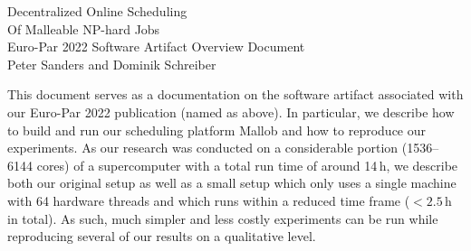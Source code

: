 \documentclass[runningheads]{article}
\numberwithin{dummy}{subsection}
\begin{document}
\begin{center}
\huge Decentralized Online Scheduling\\Of Malleable NP-hard Jobs\\[0.4cm]
\Large Euro-Par 2022 Software Artifact Overview Document\\[0.4cm]
\large Peter Sanders and Dominik Schreiber
\end{center}


%
%
%
%
%
%
%
%

\newenvironment{ttfenv}{\par\vspace{0.2cm}\ttfamily}{\par\vspace{0.2cm}}
\newenvironment{ttfenvcompact}{\par\ttfamily}{\par}

\vspace{0.3cm}

This document serves as a documentation on the software artifact associated with our Euro-Par 2022 publication (named as above).
In particular, we describe how to build and run our scheduling platform Mallob and how to reproduce our experiments.
As our research was conducted on a considerable portion (1536--6144 cores) of a supercomputer with a total run time of around 14\,h, we describe both our original setup as well as a small setup which only uses a single machine with 64 hardware threads and which runs within a reduced time frame ($<2.5$\,h in total).
As such, much simpler and less costly experiments can be run while reproducing several of our results on a qualitative level.
\end{document}

